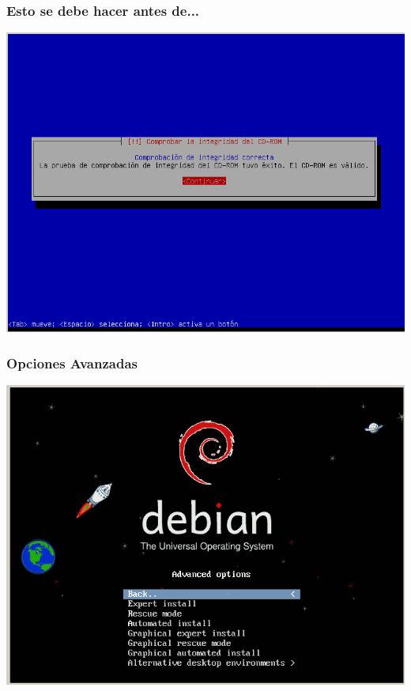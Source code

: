 \documentclass{beamer}
\begin{document}
\begin{frame}
\frametitle{Esto se debe hacer antes de...}
\includegraphics[height=0.8\textheight]{./imgs/5_install_comprobaciondeCD.png} \hspace*{7.3cm}
\end{frame} 

\begin{frame}
\frametitle{Opciones Avanzadas}
\includegraphics[height=0.8\textheight]{./imgs/3_opt_avan.png} \hspace*{7.3cm}
\end{frame}
\end{document}
